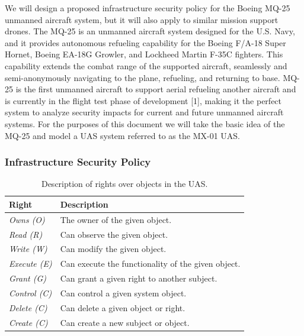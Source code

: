 \documentclass[10pt,journal,compsoc]{IEEEtran}
\begin{document}
We will design a proposed infrastructure security policy for the Boeing MQ-25 unmanned aircraft system, but it will also apply to similar mission support drones. 
The MQ-25 is an unmanned aircraft system designed for the U.S. Navy, and it provides autonomous refueling capability for the Boeing F/A-18 Super Hornet, Boeing EA-18G Growler, and Lockheed Martin F-35C fighters.
This capability extends the combat range of the supported aircraft, seamlessly and semi-anonymously navigating to the plane, refueling, and returning to base. 
MQ-25 is the first unmanned aircraft to support aerial refueling another aircraft and is currently in the flight test phase of development [1], making it the perfect system to analyze security impacts for current and future unmanned aircraft systems. For the purposes of this document we will take the basic idea of the MQ-25 and model a UAS system referred to as the MX-01 UAS. 

\subsubsection{Infrastructure Security Policy}

\begin{table}[]
  \caption{Description of rights over objects in the UAS.}
  \begin{tabular}{ll}
  \hline
  \textbf{Right}       & \textbf{Description}                               \\ 
  \hline
  \textit{Owns (O)}    & The owner of the given object.                     \\
  \textit{Read (R)}    & Can observe the given object.                      \\
  \textit{Write (W)}   & Can modify the given object.                       \\
  \textit{Execute (E)} & Can execute the functionality of the given object. \\
  \textit{Grant (G)}   & Can grant a given right to another subject.        \\
  \textit{Control (C)} & Can control a given system object.                 \\
  \textit{Delete (C)}  & Can delete a given object or right.                 \\
  \textit{Create (C)}  & Can create a new subject or object.                 \\
  \end{tabular}
\end{table}
\end{document}

